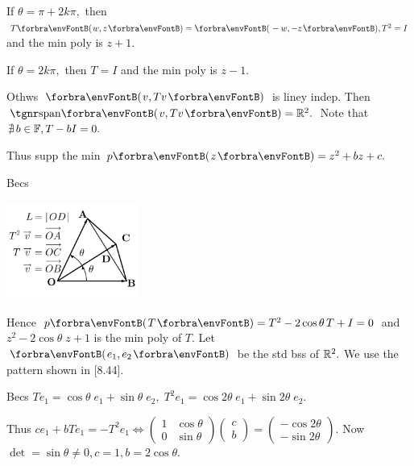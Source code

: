 \par\quad
If $\theta=\pi+2k\pi,$ then $T\Par{w,z}=\Par{-w,-z},T^2=I$ and the min poly is $z+1.$\par\quad
If $\theta=2k\pi,$ then $T=I$ and the min poly is $z-1.$\par\quad
Othws $\Par{v,Tv}$ is liney indep. Then $\Span{v,Tv}=\Rbb^2.$ Note that $\nexists\,b\in{\mathbb{F}},T-bI=0.$\par\quad
\par\vspace{-16pt}\quad
Thus supp the min $p\Par{z}=z^2+bz+c.$\par\vspace{20pt}\quad
Becs\vspace{-35pt}\par\quad
\hspace{50pt}\includegraphics[width=4.4cm,height=3.2cm,scale=0.22]{diagram5BI-1.png}\par\vspace{-70pt}\quad
{}\par\quad
Hence $p\Par{T}=T^2-2\cos\theta\, T+I=0$ and $z^2-2\cos\theta\;z+1$ is the min poly of $T.$\PfEnd\vspace{6pt}\quad
\Or Let $\Par{e_1,e_2}$ be the std bss of ${\mathbb{R}}^2.$ We use the pattern shown in [8.44].\par\quad
Becs $Te_1=\cos\theta\;e_1+\sin\theta\;e_2,\;T^2e_1=\cos2\theta\;e_1+\sin2\theta\;e_2.$\par\vspace{2pt}\quad
Thus \;$ce_1+bTe_1=-T^2 e_1\Longleftrightarrow{}${\small$\begin{pmatrix}
	1 & \cos\theta\\
	0 & \sin\theta
\end{pmatrix}\begin{pmatrix}
	c \\ b
\end{pmatrix}$}${}={}${\small$\begin{pmatrix}
-\cos2\theta\\
-\sin2\theta
\end{pmatrix}$}. Now $\det=\sin\theta\neq 0,c=1,b=2\cos\theta.$\PfEnd\vspace{12pt}\quad

